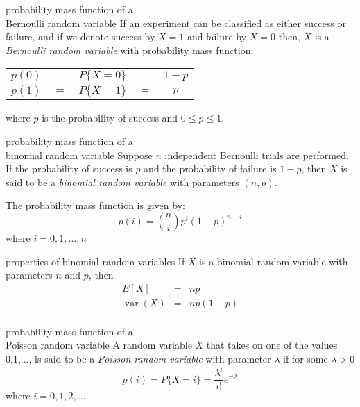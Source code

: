 \documentclass[avery5371,grid]{flashcards}
\DeclareMathOperator{\var}{var}
\begin{document}
\begin{flashcard}[Definition]{probability mass function of a \\
Bernoulli random variable}
If an experiment can be classified as either success or failure, and if
we denote success by $X=1$ and failure by $X=0$ then, $X$ is a
\textit{Bernoulli random variable} with probability mass function:
\medskip
\begin{center}
\begin{tabular}{ccccc}
$p(0)$ & $=$ & $P\lbrace X=0\rbrace$ & $=$ & $1-p$ \\
$p(1)$ & $=$ & $P\lbrace X=1\rbrace$ & $=$ & $p$ \\
\end{tabular}
\end{center}
where $p$ is the probability of success and $0\leq p \leq 1$.
\end{flashcard}

\begin{flashcard}[Definition]{probability mass function of a \\
binomial random variable}
Suppose $n$ independent Bernoulli trials are performed.  If the probability
of success is $p$ and the probability of failure is $1-p$, then $X$ is said
to be a \textit{binomial random variable} with parameters $(n,p)$.

The probability mass function is given by:
\begin{displaymath}
p(i) = {n \choose i} p^i(1-p)^{n-i}
\end{displaymath}
where $i=0,1,\ldots ,n$
\end{flashcard}

\begin{flashcard}[Theorem]{properties of binomial random variables}
If $X$ is a binomial random variable with parameters $n$ and $p$, then
\begin{eqnarray*}
E[X] &=& np \\
\var(X) &=& np(1-p) \\
\end{eqnarray*}
\end{flashcard}

\begin{flashcard}[Definition]{probability mass function of a \\
Poisson random variable}
A random variable $X$ that takes on one of the values 0,1,$\ldots$, is
said to be a \textit{Poisson random variable} with parameter $\lambda$
if for some $\lambda > 0$
\begin{displaymath}
p(i) = P \lbrace X=i \rbrace  = \frac{\lambda^i}{i!}e^{-\lambda}
\end{displaymath}
where $i = 0,1,2,\ldots$
\end{flashcard}
\end{document}
